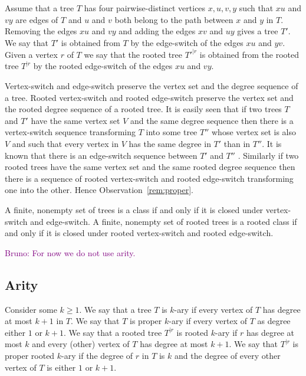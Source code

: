 \documentclass[11 pt]{modarticle}
\newcommand{\rtree}[2]{{#1}^{\lvert #2}}
\newcommand{\tclass}{\mathcal{C}}
\newcommand{\rtclass}{\mathcal{R}}
\newcommand{\bldcomment}[1]{\textcolor{purple}{{\footnotesize Bruno:} #1}}
\begin{document}
\begin{defi}
Assume that a tree $T$ has four pairwise-distinct vertices $x,u,v,y$ such that $xu$ and $vy$ are edges of $T$ and $u$ and $v$ both belong to the path between $x$ and $y$ in $T$. Removing the edges $xu$ and $vy$ and adding the edges $xv$ and $uy$ gives a tree $T'$. We say that $T'$ is obtained from $T$ by the edge-switch of the edges $xu$ and $yv$. Given a vertex $r$ of $T$ we say that the rooted tree $\rtree{T'}{r}$ is obtained from the rooted tree $\rtree{T}{r}$ by the rooted edge-switch of the edges $xu$ and $vy$.
\end{defi}

Vertex-switch and edge-switch preserve the vertex set and the degree sequence of a tree. Rooted vertex-switch and rooted edge-switch preserve the vertex set and the rooted degree sequence of a rooted tree. It is easily seen that if two trees $T$ and $T'$ have the same vertex set $V$ and the same degree sequence then there is a vertex-switch sequence transforming $T$ into some tree $T''$ whose vertex set is also $V$ and such that every vertex in $V$ has the same degree in $T'$ than in $T''$. It is known that there is an edge-switch sequence between $T'$ and $T''$ \cite[Theorem~4.3]{switch}. Similarly if two rooted trees have the same vertex set and the same rooted degree sequence then there is a sequence of rooted vertex-switch and rooted edge-switch transforming one into the other. Hence Observation~\ref{rem:proper}.

\begin{rem}\label{rem:proper}
A finite, nonempty set of trees is a class if and only if it is closed under vertex-switch and edge-switch. A finite, nonempty set of rooted trees is a rooted class if and only if it is closed under rooted vertex-switch and rooted edge-switch.
\end{rem}

\bldcomment{For now we do not use arity.}
\subsection{Arity}

Consider some $k \geq 1$. We say that a tree $T$ is $k$-ary if every vertex of $T$ has degree at most $k+1$ in $T$. We say that $T$ is proper $k$-ary if every vertex of $T$ as degree either $1$ or $k+1$. We say that a rooted tree $\rtree{T}{r}$ is rooted $k$-ary if $r$ has degree at most $k$ and every (other) vertex of $T$ has degree at most $k+1$. We say that $\rtree{T}{r}$ is proper rooted $k$-ary if the degree of $r$ in $T$ is $k$ and the degree of every other vertex of $T$ is either $1$ or $k+1$. 
\end{document}
